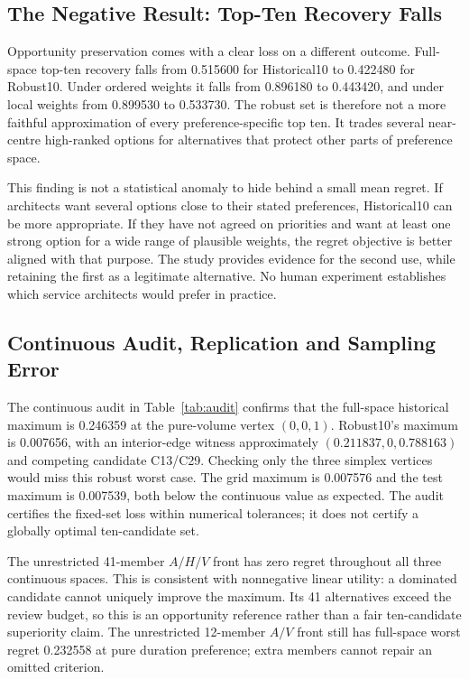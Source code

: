 \documentclass{llncs}
\begin{document}
\subsection{The Negative Result: Top-Ten Recovery Falls}
Opportunity preservation comes with a clear loss on a different outcome. Full-space top-ten recovery falls from 0.515600 for Historical10 to 0.422480 for Robust10. Under ordered weights it falls from 0.896180 to 0.443420, and under local weights from 0.899530 to 0.533730. The robust set is therefore not a more faithful approximation of every preference-specific top ten. It trades several near-centre high-ranked options for alternatives that protect other parts of preference space.

This finding is not a statistical anomaly to hide behind a small mean regret. If architects want several options close to their stated preferences, Historical10 can be more appropriate. If they have not agreed on priorities and want at least one strong option for a wide range of plausible weights, the regret objective is better aligned with that purpose. The study provides evidence for the second use, while retaining the first as a legitimate alternative. No human experiment establishes which service architects would prefer in practice.

\subsection{Continuous Audit, Replication and Sampling Error}


The continuous audit in Table~\ref{tab:audit} confirms that the full-space historical maximum is 0.246359 at the pure-volume vertex $(0,0,1)$. Robust10's maximum is 0.007656, with an interior-edge witness approximately $(0.211837,0,0.788163)$ and competing candidate C13/C29. Checking only the three simplex vertices would miss this robust worst case. The grid maximum is 0.007576 and the test maximum is 0.007539, both below the continuous value as expected. The audit certifies the fixed-set loss within numerical tolerances; it does not certify a globally optimal ten-candidate set.

The unrestricted 41-member $A/H/V$ front has zero regret throughout all three continuous spaces. This is consistent with nonnegative linear utility: a dominated candidate cannot uniquely improve the maximum. Its 41 alternatives exceed the review budget, so this is an opportunity reference rather than a fair ten-candidate superiority claim. The unrestricted 12-member $A/V$ front still has full-space worst regret 0.232558 at pure duration preference; extra members cannot repair an omitted criterion.
\end{document}
